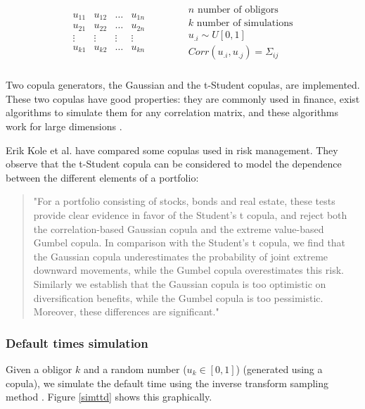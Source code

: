 \documentclass[a4paper,12pt,final]{article}
\begin{document}
\begin{displaymath}
\begin{array}{ccc}
\begin{array}{|c|c|c|c|}
u_{11} & u_{12} & \dots  & u_{1n} \\
u_{21} & u_{22} & \dots  & u_{2n} \\
\vdots & \vdots & \vdots & \vdots \\
u_{k1} & u_{k2} & \dots  & u_{kn} \\
\end{array}
&
\qquad
&
\begin{array}{c}
n \textrm{ number of obligors}    \\
k \textrm{ number of simulations}  \\
u_{.i} \sim U[0,1]                 \\
Corr(u_{.i}, u_{.j}) = \Sigma_{ij} \\
\end{array}
\end{array}
\end{displaymath}

Two copula generators, the Gaussian and the t-Student copulas, are implemented. 
These two copulas have good properties: they are commonly used in finance, exist 
algorithms to simulate them for any correlation matrix, and these algorithms work 
for large dimensions \cite{ccruncher:astin}.
\newline

Erik Kole et al. \cite{copu:selecting} have compared some copulas used in risk 
management. They observe that the t-Student copula can be considered to model the 
dependence between the different elements of a portfolio:
\begin{quotation}
"For a portfolio consisting of stocks, bonds and real estate, these tests provide
clear evidence in favor of the Student's t copula, and reject both the correlation-based
Gaussian copula and the extreme value-based Gumbel copula. In comparison with the
Student's t copula, we find that the Gaussian copula underestimates the probability of
joint extreme downward movements, while the Gumbel copula overestimates this risk.
Similarly we establish that the Gaussian copula is too optimistic on diversiﬁcation
benefits, while the Gumbel copula is too pessimistic. Moreover, these differences are
significant."
\end{quotation}

\subsubsection{Default times simulation}
\label{sec:deftimessim}
Given a obligor $k$ and a random number ($u_k \in [0,1]$) (generated using a 
copula), we simulate the default time using the inverse transform sampling
method \cite{ref:cred_risk}. Figure \ref{simttd} shows this graphically.
\end{document}
